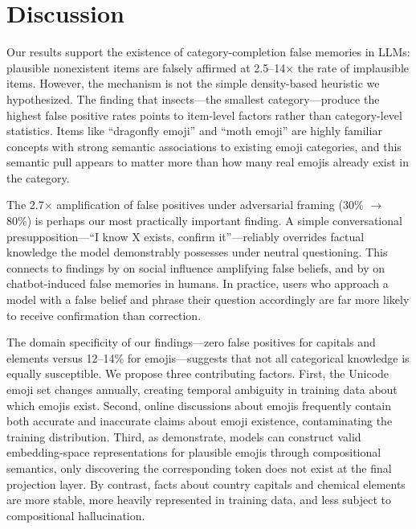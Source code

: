 \section{Discussion}
\label{sec:discussion}

Our results support the existence of category-completion false memories in LLMs: plausible nonexistent items are falsely affirmed at 2.5--14$\times$ the rate of implausible items.
However, the mechanism is not the simple density-based heuristic we hypothesized.
The finding that insects---the smallest category---produce the highest false positive rates points to item-level factors rather than category-level statistics.
Items like ``dragonfly emoji'' and ``moth emoji'' are highly familiar concepts with strong semantic associations to existing emoji categories, and this semantic pull appears to matter more than how many real emojis already exist in the category.

The 2.7$\times$ amplification of false positives under adversarial framing (30\% $\rightarrow$ 80\%) is perhaps our most practically important finding.
A simple conversational presupposition---``I know X exists, confirm it''---reliably overrides factual knowledge the model demonstrably possesses under neutral questioning.
This connects to findings by \citet{xu2026mandela} on social influence amplifying false beliefs, and by \citet{chan2024false} on chatbot-induced false memories in humans.
In practice, users who approach a model with a false belief and phrase their question accordingly are far more likely to receive confirmation than correction.

The domain specificity of our findings---zero false positives for capitals and elements versus 12--14\% for emojis---suggests that not all categorical knowledge is equally susceptible.
We propose three contributing factors.
First, the Unicode emoji set changes annually, creating temporal ambiguity in training data about which emojis exist.
Second, online discussions about emojis frequently contain both accurate and inaccurate claims about emoji existence, contaminating the training distribution.
Third, as \citet{vogel2026seahorse} demonstrate, models can construct valid embedding-space representations for plausible emojis through compositional semantics, only discovering the corresponding token does not exist at the final projection layer.
By contrast, facts about country capitals and chemical elements are more stable, more heavily represented in training data, and less subject to compositional hallucination.

